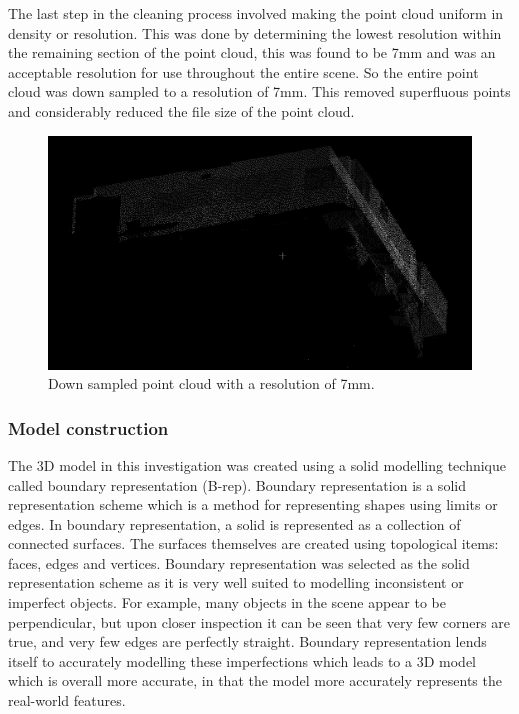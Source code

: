 \documentclass[11pt,a4paper]{report}
\begin{document}
				The last step in the cleaning process involved making the point cloud uniform in density or resolution. This was done by determining the lowest resolution within the remaining section of the point cloud, this was found to be 7mm and was an acceptable resolution for use throughout the entire scene. So the entire point cloud was down sampled to a resolution of 7mm. This removed superfluous points and considerably reduced the file size of the point cloud.
				
				\begin{figure}[H]
					\centering
					\includegraphics[width=1\textwidth]{uniform_point_cloud_1}
					\caption[Down sampled point cloud]{Down sampled point cloud with a resolution of 7mm.}
				\end{figure}
			
			\subsubsection{Model construction}
				The 3D model in this investigation was created using a solid modelling technique called boundary representation (B-rep). Boundary representation is a solid representation scheme which is a method for representing shapes using limits or edges. In boundary representation, a solid is represented as a collection of connected surfaces. The surfaces themselves are created using topological items: faces, edges and vertices.
				\parencite{hongxin_zhang_introduction_2007}
				Boundary representation was selected as the solid representation scheme as it is very well suited to modelling inconsistent or imperfect objects. For example, many objects in the scene appear to be perpendicular, but upon closer inspection it can be seen that very few corners are true, and very few edges are perfectly straight. Boundary representation lends itself to accurately modelling these imperfections which leads to a 3D model which is overall more accurate, in that the model more accurately represents the real-world features.
				
\end{document}

